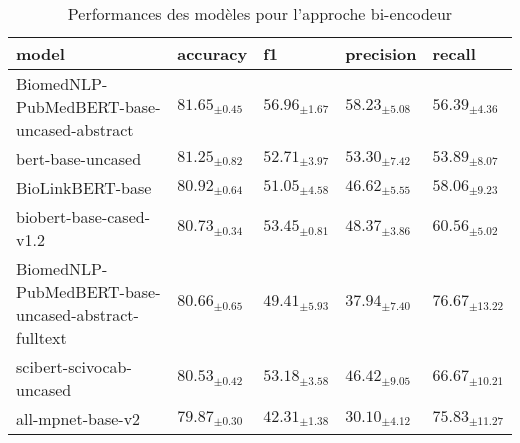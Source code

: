 \begin{table}[!ht]
\caption{Performances des modèles pour l'approche bi-encodeur}
\label{tab:outcome-sim-bi-encoder-results}
\begin{tabular}{lllll}
\toprule
\textbf{model} & \textbf{accuracy} & \textbf{f1} & \textbf{precision} & \textbf{recall} \\
\midrule
BiomedNLP-PubMedBERT-base-uncased-abstract & $81.65_{\pm0.45}$ & $56.96_{\pm1.67}$ & $58.23_{\pm5.08}$ & $56.39_{\pm4.36}$ \\
bert-base-uncased & $81.25_{\pm0.82}$ & $52.71_{\pm3.97}$ & $53.30_{\pm7.42}$ & $53.89_{\pm8.07}$ \\
BioLinkBERT-base & $80.92_{\pm0.64}$ & $51.05_{\pm4.58}$ & $46.62_{\pm5.55}$ & $58.06_{\pm9.23}$ \\
biobert-base-cased-v1.2 & $80.73_{\pm0.34}$ & $53.45_{\pm0.81}$ & $48.37_{\pm3.86}$ & $60.56_{\pm5.02}$ \\
BiomedNLP-PubMedBERT-base-uncased-abstract-fulltext & $80.66_{\pm0.65}$ & $49.41_{\pm5.93}$ & $37.94_{\pm7.40}$ & $76.67_{\pm13.22}$ \\
scibert-scivocab-uncased & $80.53_{\pm0.42}$ & $53.18_{\pm3.58}$ & $46.42_{\pm9.05}$ & $66.67_{\pm10.21}$ \\
all-mpnet-base-v2 & $79.87_{\pm0.30}$ & $42.31_{\pm1.38}$ & $30.10_{\pm4.12}$ & $75.83_{\pm11.27}$ \\
\bottomrule
\end{tabular}
\end{table}
